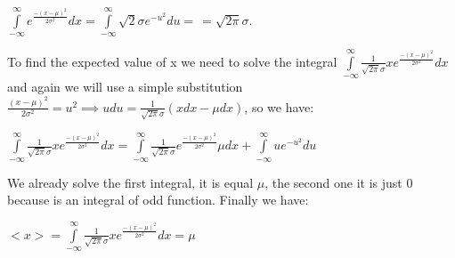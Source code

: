 \documentclass[paper=9in:6in,pagesize=pdftex,headinclude=on,footinclude=on,10pt,bibtotoc,pointlessnumbers,normalheadings,DIV=9,twoside=false]{scrbook}
\begin{document}
\begin{center}
    $\int\limits_{-\infty}^{\infty} e^{\frac{-(x-\mu)^2}{2\sigma^2}}dx = \int\limits_{-\infty}^{\infty} \sqrt{2}\sigma e^{-u^2}du = \frac{}{} = \sqrt{2\pi}\sigma$. \\
\end{center}

\begin{text}
To find the expected value of x we need to solve the integral $\int\limits_{-\infty}^{\infty} \frac{1}{\sqrt{2\pi}\sigma} x e^{\frac{-(x-\mu)^2}{2\sigma^2}}dx $ and again we will use a simple substitution $\frac{(x-\mu)^2}{2\sigma^2} = u^2 \implies udu = \frac{1}{\sqrt{2\pi}\sigma} (xdx -  \mu dx)$, so we have: \\
\end{text}

\begin{center}
$\int\limits_{-\infty}^{\infty} \frac{1}{\sqrt{2\pi}\sigma} x e^{\frac{-(x-\mu)^2}{2\sigma^2}}dx = \int\limits_{-\infty}^{\infty} \frac{1}{\sqrt{2\pi}\sigma}  e^{\frac{-(x-\mu)^2}{2\sigma^2}} \mu dx + \int\limits_{-\infty}^{\infty} u  e^{-u^2}du  $    
\end{center}

\begin{text}
We already solve the first integral, it is equal $\mu$, the second one it is just 0 because is an integral of odd function. Finally we have:
\end{text}

\begin{center}
    $<x> = \int\limits_{-\infty}^{\infty} \frac{1}{\sqrt{2\pi}\sigma} x e^{\frac{-(x-\mu)^2}{2\sigma^2}}dx = \mu $
\end{center}
\end{document}
